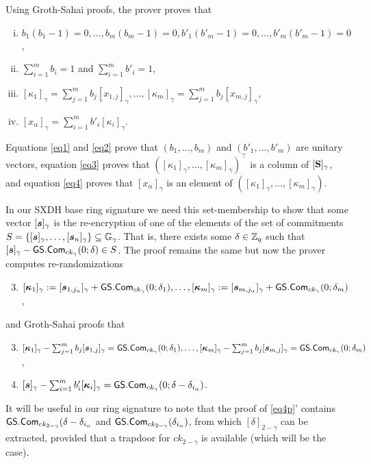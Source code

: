 Using Groth-Sahai proofs, the prover proves that
\begin{enumerate}[i.]
\item $b_1(b_1-1)=0,\ldots,b_m(b_m-1)=0,b'_1(b'_m-1)=0,\ldots,b'_m(b'_m-1)=0$,\label{eq1}
\item $\sum_{i=1}^m b_i =1$ and $\sum_{i=1}^m b'_i=1$,\label{eq2}
\item $[\kappa_1]_\gamma=\sum_{j=1}^m b_j [x_{1,j}]_\gamma,\ldots,[\kappa_m]_\gamma=\sum_{j=1}^m b_j[x_{m,j}]_\gamma$,\label{eq3}
\item $[x_\alpha]_\gamma=\sum_{i=1}^m b'_i[\kappa_i]_\gamma$.\label{eq4}
\end{enumerate}
Equations \ref{eq1} and \ref{eq2} prove that $(b_1,\ldots,b_m)$ and $(b'_1,\ldots,b'_m)$ are unitary vectors, equation \ref{eq3} proves that $([\kappa_1]_\gamma,\ldots,[\kappa_m]_\gamma)^\top$ is a column of $[\mathbf{{S}}]_\gamma$, and equation \ref{eq4} proves that $[x_\alpha]_\gamma$ is an element of $([\kappa_1]_\gamma,\ldots,[\kappa_m]_\gamma)$.

In our SXDH base ring signature we need this set-membership to show that some vector $[{\boldsymbol{s}}]_\gamma$ is the re-encryption of one of the elements of the set of commitments $S = \{[{\boldsymbol{s}}]_\gamma,\ldots,[{\boldsymbol{s}}_n]_\gamma\}\subseteq\mathbb{G}_\gamma$. That is, there exists some $\delta\in\mathbb{Z}_q$ such that $[{\boldsymbol{s}}]_\gamma-{\mathsf{GS}}.\mathsf{Com}_{ck_\gamma}(0;\delta)\in S$. The proof remains the same but now
the prover computes re-randomizations
\begin{enumerate}[1'.]
\setcounter{enumi}{2}
\item $[{\boldsymbol{\kappa}}_1]_\gamma:=[{\boldsymbol{s}}_{1,j_\alpha}]_\gamma+{\mathsf{GS}}.\mathsf{Com}_{ck_\gamma}(0;\delta_1),\ldots,[{\boldsymbol{\kappa}}_m]_\gamma:=[{\boldsymbol{s}}_{m,j_\alpha}]_\gamma+{\mathsf{GS}}.\mathsf{Com}_{ck_\gamma}(0;\delta_m)$,
\end{enumerate}
and Groth-Sahai proofs that
\begin{enumerate}[i'.]
\setcounter{enumi}{2}
\item $[{\boldsymbol{\kappa}}_1]_\gamma - \sum_{j=1}^m b_j [{\boldsymbol{s}}_{1,j}]_\gamma = {\mathsf{GS}}.\mathsf{Com}_{ck_\gamma}(0;\delta_1),\ldots,[{\boldsymbol{\kappa}}_m]_\gamma-\sum_{j=1}^m b_j[{\boldsymbol{s}}_{m,j}]_\gamma = {\mathsf{GS}}.\mathsf{Com}_{ck_\gamma}(0;\delta_m)$,\label{eq3p}
\item $[{\boldsymbol{s}}]_\gamma - \sum_{i=1}^m b'_i[{\boldsymbol{\kappa}}_i]_\gamma  = {\mathsf{GS}}.\mathsf{Com}_{ck_\gamma}(0;\delta-\delta_{i_\alpha})$.\label{eq4p}
\end{enumerate}
It will be useful in our ring signature to note that the proof of \ref{eq4p}' contains ${\mathsf{GS}}.\mathsf{Com}_{ck_{2-\gamma}}(\delta-\delta_{i_\alpha}$ and ${\mathsf{GS}}.\mathsf{Com}_{ck_{2-\gamma}}(\delta_{i_\alpha})$, from which $[\delta]_{2-\gamma}$ can be extracted, provided that a trapdoor for $ck_{2-\gamma}$ is available (which will be the case).